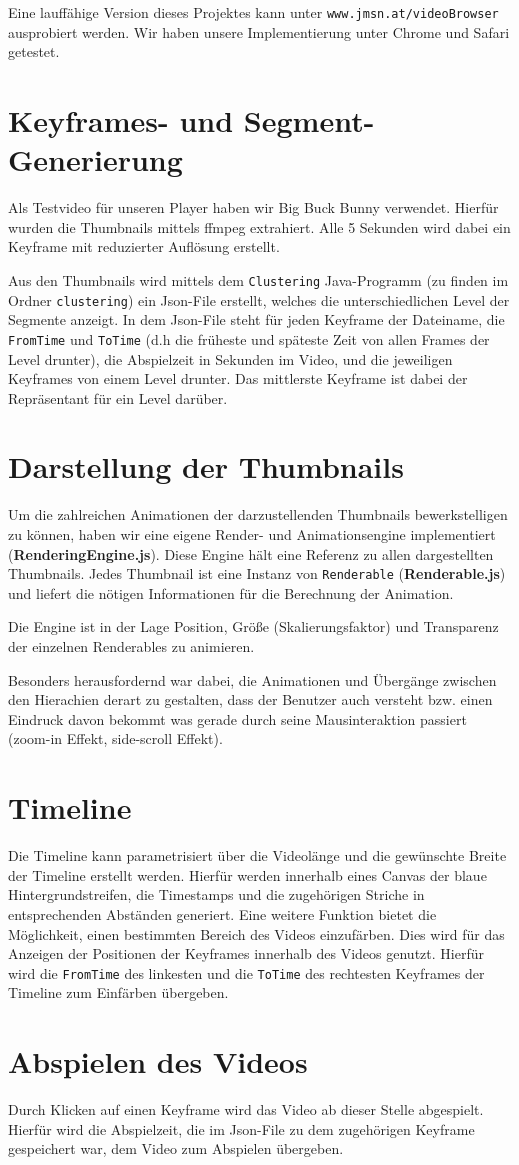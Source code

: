 \documentclass[a4paper,11pt,german]{scrartcl}
\begin{document}
Eine lauffähige Version dieses Projektes kann unter \lstinline$www.jmsn.at/videoBrowser$ ausprobiert werden. Wir haben unsere Implementierung unter Chrome und Safari getestet.

\section*{Keyframes- und Segment-Generierung}
Als Testvideo für unseren Player haben wir Big Buck Bunny verwendet. Hierfür wurden die Thumbnails mittels ffmpeg extrahiert. Alle 5 Sekunden wird dabei ein Keyframe mit reduzierter Auflösung erstellt.

Aus den Thumbnails wird mittels dem \texttt{Clustering} Java-Programm (zu finden im Ordner \lstinline$clustering$) ein Json-File erstellt, welches die unterschiedlichen Level der Segmente anzeigt. In dem Json-File steht für jeden Keyframe der Dateiname, die \texttt{FromTime} und \texttt{ToTime} (d.h die früheste und späteste Zeit von allen Frames der Level drunter), die Abspielzeit in Sekunden im Video, und die jeweiligen Keyframes von einem Level drunter. Das mittlerste Keyframe ist dabei der Repräsentant für ein Level darüber.

\section*{Darstellung der Thumbnails}
Um die zahlreichen Animationen der darzustellenden Thumbnails bewerkstelligen zu können, haben wir eine eigene Render- und Animationsengine implementiert (\textbf{RenderingEngine.js}). Diese Engine hält eine Referenz zu allen dargestellten Thumbnails. Jedes Thumbnail ist eine Instanz von \lstinline$Renderable$ (\textbf{Renderable.js}) und liefert die nötigen Informationen für die Berechnung der Animation.

Die Engine ist in der Lage Position, Größe (Skalierungsfaktor) und Transparenz der einzelnen Renderables zu animieren.

Besonders herausfordernd war dabei, die Animationen und Übergänge zwischen den Hierachien derart zu gestalten, dass der Benutzer auch versteht bzw. einen Eindruck davon bekommt was gerade durch seine Mausinteraktion passiert (zoom-in Effekt, side-scroll Effekt).

\section*{Timeline}
Die Timeline kann parametrisiert über die Videolänge und die gewünschte Breite der Timeline erstellt werden. Hierfür werden innerhalb eines Canvas der blaue Hintergrundstreifen, die Timestamps und die zugehörigen Striche in entsprechenden Abständen generiert. Eine weitere Funktion bietet die Möglichkeit, einen bestimmten Bereich des Videos einzufärben. Dies wird für das Anzeigen der Positionen der Keyframes innerhalb des Videos genutzt. Hierfür wird die \texttt{FromTime} des linkesten und die \texttt{ToTime} des rechtesten Keyframes der Timeline zum Einfärben übergeben. 

\section*{Abspielen des Videos}
Durch Klicken auf einen Keyframe wird das Video ab dieser Stelle abgespielt. Hierfür wird die Abspielzeit, die im Json-File zu dem zugehörigen Keyframe gespeichert war, dem Video zum Abspielen übergeben.
\end{document}
